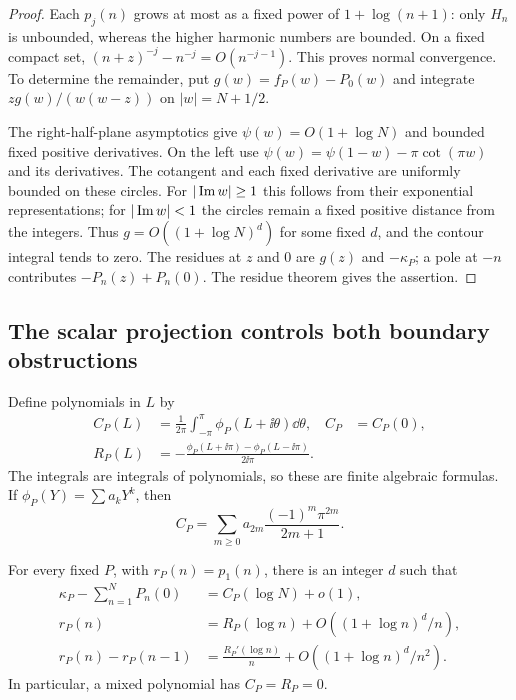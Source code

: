 \begin{proof}
Each $p_j(n)$ grows at most as a fixed power of $1+\log(n+1)$:
only $H_n$ is unbounded, whereas the higher harmonic numbers are bounded.
On a fixed compact set,
$(n+z)^{-j}-n^{-j}=O(n^{-j-1})$. This proves normal convergence.
To determine the remainder, put $g(w)=f_P(w)-P_0(w)$ and integrate
$zg(w)/(w(w-z))$ on $|w|=N+1/2$.

The right-half-plane asymptotics give $\psi(w)=O(1+\log N)$ and
bounded fixed positive derivatives. On the left use
$\psi(w)=\psi(1-w)-\pi\cot(\pi w)$ and its derivatives.
The cotangent and each fixed derivative are uniformly bounded on these
circles. For $|\operatorname{Im} w|\ge1$ this follows from their exponential
representations; for $|\operatorname{Im} w|<1$ the circles remain a fixed positive
distance from the integers. Thus $g=O((1+\log N)^d)$ for some fixed
$d$, and the contour integral tends to zero. The residues at $z$ and
$0$ are $g(z)$ and $-\kappa_P$; a pole at $-n$ contributes
$-P_n(z)+P_n(0)$. The residue theorem gives the assertion.
\end{proof}

\subsection{The scalar projection controls both boundary obstructions}

Define polynomials in $L$ by
\begin{align}
 C_P(L)&=\frac1{2\pi}\int_{-\pi}^{\pi}\phi_P(L+\ii\theta)\dd\theta,
 & C_P&=C_P(0),\label{poly:C}\\
 R_P(L)&=-\frac{\phi_P(L+\ii\pi)-\phi_P(L-\ii\pi)}{2\ii\pi}.
 \label{poly:R}
\end{align}
The integrals are integrals of polynomials, so these are finite algebraic
formulas. If $\phi_P(Y)=\sum a_kY^k$, then
\begin{equation}\label{poly:Cexplicit}
 C_P=\sum_{m\ge0}a_{2m}\frac{(-1)^m\pi^{2m}}{2m+1}.
\end{equation}

\begin{theorem}
\label{poly:filter}
For every fixed $P$, with $r_P(n)=p_1(n)$, there is an integer $d$ such that
\begin{align}
 \kappa_P-\sum_{n=1}^NP_n(0)&=C_P(\log N)+o(1),\label{poly:circle}\\
 r_P(n)&=R_P(\log n)+O((1+\log n)^d/n),\label{poly:rasym}\\
 r_P(n)-r_P(n-1)&=\frac{R_P'(\log n)}n
                      +O((1+\log n)^d/n^2).\label{poly:deltarasym}
\end{align}
In particular, a mixed polynomial has $C_P=R_P=0$.
\end{theorem}

